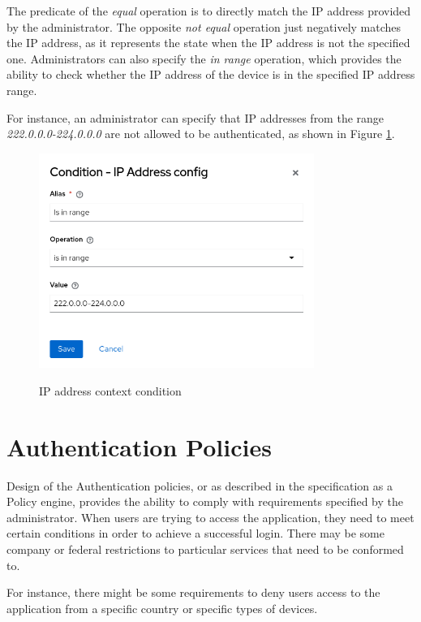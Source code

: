 The predicate of the \textit{equal} operation is to directly match the IP address provided by the administrator.
The opposite \textit{not equal} operation just negatively matches the IP address, as it represents the state when the IP address is not the specified one.
Administrators can also specify the \textit{in range} operation, which provides the ability to check whether the IP address of the device is in the specified IP address range.

For instance, an administrator can specify that IP addresses from the range \textit{222.0.0.0-224.0.0.0} are not allowed to be authenticated, as shown in Figure \ref{fig:design-user-context-ip-addr-condition}.

\begin{figure}[htbp]
  \centering
  \includegraphics[width=0.8\textwidth]{img/sections/5-design/ip-address-condition.png}
  \label{fig:design-user-context-ip-addr-condition}
  \caption{IP address context condition}
\end{figure}

\newpage

\section{Authentication Policies} \label{authentication-policies}
Design of the Authentication policies, or as described in the specification as a Policy engine, provides the ability to comply with requirements specified by the administrator.
When users are trying to access the application, they need to meet certain conditions in order to achieve a successful login.
There may be some company or federal restrictions to particular services that need to be conformed to.

For instance, there might be some requirements to deny users access to the application from a specific country or specific types of devices.

